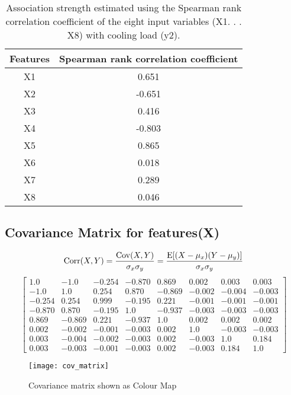     \begin{table}[h!]
          \centering
          \caption{Association strength estimated using the Spearman rank correlation coefficient of the eight input variables (X1. . . X8) with cooling load (y2).}
          \label{tab:sprcoeffcl}
          \begin{tabular}{c|c}
            Features & Spearman rank correlation coefficient\\
            \hline
            X1 & 0.651 \\
            \hline
            X2 & -0.651 \\
            \hline
            X3 & 0.416 \\
            \hline
            X4 & -0.803 \\
            \hline
            X5 & 0.865 \\
            \hline
            X6 & 0.018 \\
            \hline
            X7 & 0.289 \\
            \hline
            X8 & 0.046 \\
            \hline
          \end{tabular}
    \end{table}
    \subsection{Covariance Matrix for features(X)}
          \begin{equation}
            \mathrm{Corr}(X, Y) = \frac{\mathrm{Cov}(X, Y)}{\sigma_{x}\sigma_{y}} = \frac{\mathrm{E}[(X-\mu_{x})(Y-\mu_{y})]}{\sigma_{x}\sigma_{y}}  
          \end{equation}
          \newline
          \begin{equation}
            \left[
              \begin{matrix}
                  1.0 & -1.0 & -0.254 & -0.870 & 0.869 & 0.002 & 0.003 & 0.003\\
-1.0 & 1.0 & 0.254 & 0.870 & -0.869 & -0.002 & -0.004 & -0.003\\
-0.254 & 0.254 & 0.999 & -0.195 & 0.221 & -0.001 & -0.001 & -0.001\\
-0.870 & 0.870 & -0.195 & 1.0 & -0.937 & -0.003 & -0.003 & -0.003\\
0.869 & -0.869 & 0.221 & -0.937 & 1.0 & 0.002 & 0.002 & 0.002\\
0.002 & -0.002 & -0.001 & -0.003 & 0.002 & 1.0 & -0.003 & -0.003\\
0.003 & -0.004 & -0.002 & -0.003 & 0.002 & -0.003 & 1.0 & 0.184\\
0.003 & -0.003 & -0.001 & -0.003 & 0.002 & -0.003 & 0.184 & 1.0
              \end{matrix}
            \right]
    \end{equation}
    \begin{figure}[htbp]
      \hspace*{-6.1cm}
      \texttt{[image: cov\_matrix]}
      \caption{Covariance matrix shown as Colour Map}
      \label{fig:cov_matrix}
    \end{figure}
    \newpage  

